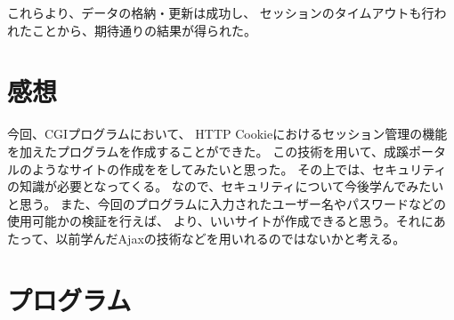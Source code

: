 \documentclass[a4j]{jarticle}
\begin{document}
これらより、データの格納・更新は成功し、
セッションのタイムアウトも行われたことから、期待通りの結果が得られた。

\section{感想}
今回、CGIプログラムにおいて、
HTTP Cookieにおけるセッション管理の機能を加えたプログラムを作成することができた。
この技術を用いて、成蹊ポータルのようなサイトの作成ををしてみたいと思った。
その上では、セキュリティの知識が必要となってくる。
なので、セキュリティについて今後学んでみたいと思う。
また、今回のプログラムに入力されたユーザー名やパスワードなどの使用可能かの検証を行えば、
より、いいサイトが作成できると思う。それにあたって、以前学んだAjaxの技術などを用いれるのではないかと考える。

\section{プログラム}

\end{document}
